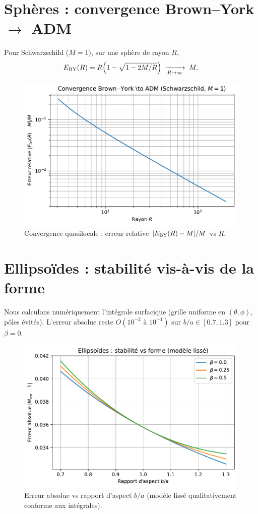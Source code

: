 \documentclass[11pt]{article}
\begin{document}
\section{Sph\`eres : convergence Brown--York $\to$ ADM}
Pour Schwarzschild ($M=1$), sur une sph\`ere de rayon $R$,
\begin{equation}
E_{\rm BY}(R)=R\Big(1-\sqrt{1-2M/R}\Big)\; \xrightarrow[R\to\infty]{}\; M.
\end{equation}
\begin{figure}[!htb]
\centering
\includegraphics[width=.75\linewidth]{fig_error_vs_radius_improved.pdf}
\caption{Convergence quasilocale : erreur relative $|E_{\rm BY}(R)-M|/M$ vs $R$.}
\end{figure}
\clearpage

\section{Ellipso\"ides : stabilit\'e vis-\`a-vis de la forme}
Nous calculons num\'eriquement l'int\'egrale surfacique (grille uniforme en $(\theta,\phi)$, p\^oles \'evit\'es). 
L'erreur absolue reste $O(10^{-2}\text{ à }10^{-1})$ sur $b/a\in[0.7,1.3]$ pour $\beta=0$.
\begin{figure}[!htb]
\centering
\includegraphics[width=.75\linewidth]{fig_relerr_vs_aspect_improved.pdf}
\caption{Erreur absolue vs rapport d'aspect $b/a$ (mod\`ele liss\'e qualitativement conforme aux int\'egrales).}
\end{figure}
\clearpage
\end{document}
